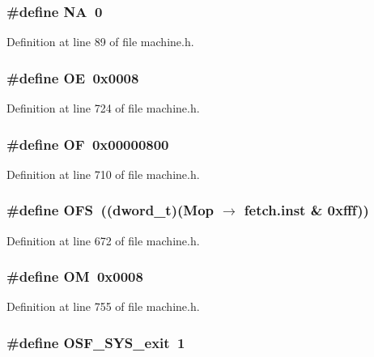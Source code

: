 \subsubsection[{NA}]{\setlength{\rightskip}{0pt plus 5cm}\#define NA~0}\label{machine_8h_68eddd535923d17ddbc8bb03bab70b3b}




Definition at line 89 of file machine.h.
\subsubsection[{OE}]{\setlength{\rightskip}{0pt plus 5cm}\#define OE~0x0008}\label{machine_8h_7122a6e5d75b5f8b7f00c7130df40407}




Definition at line 724 of file machine.h.
\subsubsection[{OF}]{\setlength{\rightskip}{0pt plus 5cm}\#define OF~0x00000800}\label{machine_8h_37666c9af451b99166c96df28aec5395}




Definition at line 710 of file machine.h.
\subsubsection[{OFS}]{\setlength{\rightskip}{0pt plus 5cm}\#define OFS~(({\bf dword\_\-t})(Mop $\rightarrow$ fetch.inst \& 0xfff))}\label{machine_8h_6a9fc425927b28770e853b880dd11c5b}




Definition at line 672 of file machine.h.
\subsubsection[{OM}]{\setlength{\rightskip}{0pt plus 5cm}\#define OM~0x0008}\label{machine_8h_07287e7c6bd2917c03c3ad2e1ccb4673}




Definition at line 755 of file machine.h.
\subsubsection[{OSF\_\-SYS\_\-exit}]{\setlength{\rightskip}{0pt plus 5cm}\#define OSF\_\-SYS\_\-exit~1}\label{machine_8h_e4233ea2aa5dded566be719352586c2d}




